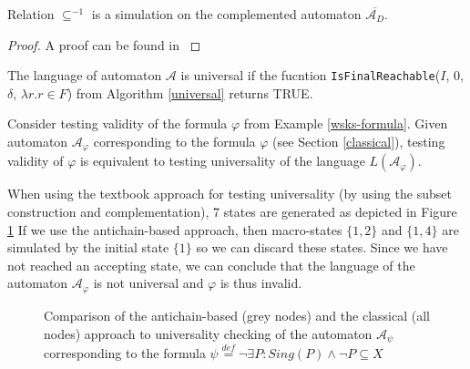 \begin{lemma}\label{simulation-in-ca}
Relation $\subseteq^{-1}$ is a simulation on the complemented automaton
$\overline{\mathcal{A}_D}$.
\end{lemma}
\begin{proof}
 A proof can be found in \cite{raskin}
\end{proof}

\begin{lemma}
The language of automaton $\mathcal{A}$ is universal if the fucntion
\texttt{IsFinalReachable}($I$, $0$, $\delta$, $\lambda r. r \in F$) from
Algorithm
\ref{universal} returns \textsc{TRUE}.
\end{lemma}

\noindent\hrulefill
\begin{example}
Consider testing validity of the formula $\varphi$ from Example
\ref{wsks-formula}.
Given automaton $\mathcal{A}_\varphi$ corresponding to the formula $\varphi$
(see Section \ref{classical}), testing validity of $\varphi$ is
equivalent to testing universality of the language $L(\mathcal{A}_\varphi)$.

When using the textbook approach for testing universality (by using the subset
construction and complementation), 7 states are generated as depicted in Figure
\ref{compare} If we use the antichain-based approach, then macro-states $\{1,
2\}$ and $\{1, 4\}$ are simulated by the initial state $\{1\}$ so we can
discard these states.
Since we have not reached an accepting state, we can conclude that the language
of the automaton $\mathcal{A}_\varphi$ is not universal and $\varphi$ is thus
invalid.
\end{example}

\noindent\hrulefill

\begin{figure}
 \begin{center}
 \end{center}
 \caption{Comparison of the antichain-based (grey nodes) and the classical (all
 nodes) approach to universality checking of the automaton $\mathcal{A}_\psi$
 corresponding to the formula $\psi \overset{\mathit{def}}{=} \neg\exists P:
 Sing(P) \wedge\neg P \subseteq X$}\label{compare}
\end{figure}

